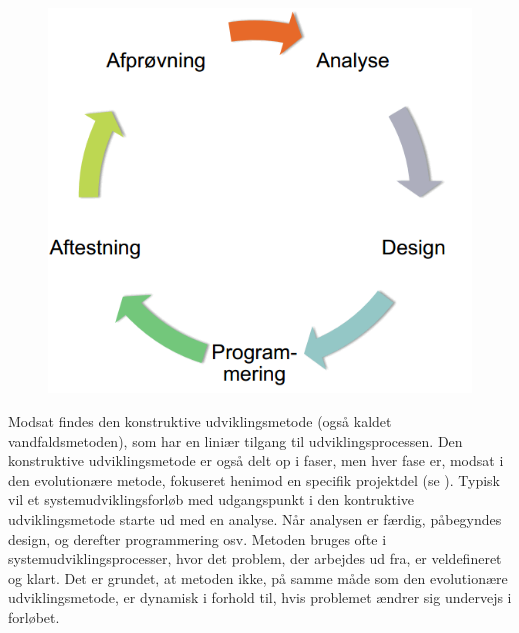 \begin{figure}[ht]
	\centering
	\includegraphics[scale=0.5]{billeder/evolutionaeremetode.png}
	\label{fig:evolutionaeremetode}
  \end{figure}

Modsat findes den konstruktive udviklingsmetode (også kaldet vandfaldsmetoden), som har en liniær tilgang til udviklingsprocessen. Den konstruktive udviklingsmetode er også delt op i faser, men hver fase er, modsat i den evolutionære metode, fokuseret henimod en specifik projektdel (se ). Typisk vil et systemudviklingsforløb med udgangspunkt i den kontruktive udviklingsmetode starte ud med en analyse. Når analysen er færdig, påbegyndes design, og derefter programmering osv. Metoden bruges ofte i systemudviklingsprocesser, hvor det problem, der arbejdes ud fra, er veldefineret og klart. Det er grundet, at metoden ikke, på samme måde som den evolutionære udviklingsmetode, er dynamisk i forhold til, hvis problemet ændrer sig undervejs i forløbet.

